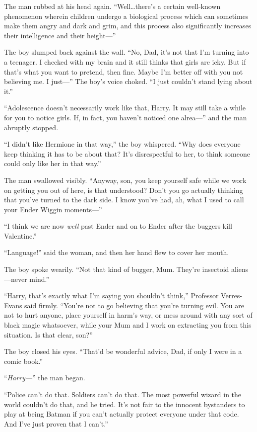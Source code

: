 The man rubbed at his head again. “Well…there’s a certain well-known phenomenon wherein children undergo a biological process which can sometimes make them angry and dark and grim, and this process also significantly increases their intelligence and their height—”

The boy slumped back against the wall. “No, Dad, it’s not that I’m turning into a teenager. I checked with my brain and it still thinks that girls are icky. But if that’s what you want to pretend, then fine. Maybe I’m better off with you not believing me. I just—” The boy’s voice choked. “I just couldn’t stand lying about it.”

“Adolescence doesn’t necessarily work like that, Harry. It may still take a while for you to notice girls. If, in fact, you haven’t noticed one alrea—” and the man abruptly stopped.

“I didn’t like Hermione in that way,” the boy whispered. “Why does everyone keep thinking it has to be about that? It’s disrespectful to her, to think someone could only like her in that way.”

The man swallowed visibly. “Anyway, son, you keep yourself safe while we work on getting you out of here, is that understood? Don’t you go actually thinking that you’ve turned to the dark side. I know you’ve had, ah, what I used to call your Ender Wiggin moments—”

“I think we are now \emph{well} past Ender and on to Ender after the buggers kill Valentine.”

“Language!” said the woman, and then her hand flew to cover her mouth.

The boy spoke wearily. “Not that kind of bugger, Mum. They’re insectoid aliens—never mind.”

“Harry, that’s exactly what I’m saying you shouldn’t think,” Professor Verres-Evans said firmly. “You’re not to go believing that you’re turning evil. You are not to hurt anyone, place yourself in harm’s way, or mess around with any sort of black magic whatsoever, while your Mum and I work on extracting you from this situation. Is that clear, son?”

The boy closed his eyes. “That’d be wonderful advice, Dad, if only I were in a comic book.”

“\emph{Harry—}” the man began.

“Police can’t do that. Soldiers can’t do that. The most powerful wizard in the world couldn’t do that, and he tried. It’s not fair to the innocent bystanders to play at being Batman if you can’t actually protect everyone under that code. And I’ve just proven that I can’t.”

